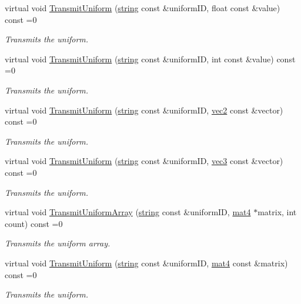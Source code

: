 \begin{DoxyCompactItemize}
virtual void \hyperlink{class_i_shader_abd23d28515bb5f2e93dc8a56b0e32f1d}{Transmit\+Uniform} (\hyperlink{_types_8h_ad453f9f71ce1f9153fb748d6bb25e454}{string} const \&uniform\+ID, float const \&value) const  =0
\begin{DoxyCompactList}\small\item\em Transmits the uniform. \end{DoxyCompactList}\item 
virtual void \hyperlink{class_i_shader_a1e0af19414155bdd4365e012ddb11e4c}{Transmit\+Uniform} (\hyperlink{_types_8h_ad453f9f71ce1f9153fb748d6bb25e454}{string} const \&uniform\+ID, int const \&value) const  =0
\begin{DoxyCompactList}\small\item\em Transmits the uniform. \end{DoxyCompactList}\item 
virtual void \hyperlink{class_i_shader_a756ed010b22051eb1b9ef01f913473b1}{Transmit\+Uniform} (\hyperlink{_types_8h_ad453f9f71ce1f9153fb748d6bb25e454}{string} const \&uniform\+ID, \hyperlink{_types_8h_a43182e59794291f6ab00e51b160706c2}{vec2} const \&vector) const  =0
\begin{DoxyCompactList}\small\item\em Transmits the uniform. \end{DoxyCompactList}\item 
virtual void \hyperlink{class_i_shader_ac487e593473654d2f5003246a18a2eca}{Transmit\+Uniform} (\hyperlink{_types_8h_ad453f9f71ce1f9153fb748d6bb25e454}{string} const \&uniform\+ID, \hyperlink{_types_8h_a3d0ce73e3199de81565fb01632415288}{vec3} const \&vector) const  =0
\begin{DoxyCompactList}\small\item\em Transmits the uniform. \end{DoxyCompactList}\item 
virtual void \hyperlink{class_i_shader_a7598536c2d31c35c8000704a9daffa2b}{Transmit\+Uniform\+Array} (\hyperlink{_types_8h_ad453f9f71ce1f9153fb748d6bb25e454}{string} const \&uniform\+ID, \hyperlink{_types_8h_a2db59f395fe82a7394c6324956c265d8}{mat4} $\ast$matrix, int count) const  =0
\begin{DoxyCompactList}\small\item\em Transmits the uniform array. \end{DoxyCompactList}\item 
virtual void \hyperlink{class_i_shader_ab9c730813328aa1ec05869cd561823aa}{Transmit\+Uniform} (\hyperlink{_types_8h_ad453f9f71ce1f9153fb748d6bb25e454}{string} const \&uniform\+ID, \hyperlink{_types_8h_a2db59f395fe82a7394c6324956c265d8}{mat4} const \&matrix) const  =0
\begin{DoxyCompactList}\small\item\em Transmits the uniform. \end{DoxyCompactList}\end{DoxyCompactItemize}


